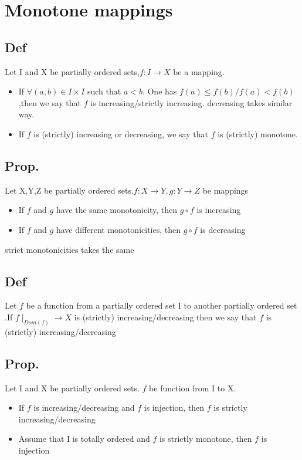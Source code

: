 \documentclass{book}
\begin{document}
\chapter{Monotone mappings}
\section{Def}

Let I and X be partially ordered sets,$f:I\rightarrow X$ be a mapping.
\begin{itemize}
    \item If $\forall(a,b)\in I\times I$ such that $a<b$. One has $f(a)\leq f(b)/f(a)<f(b)$,then we say that $f$ is increasing/strictly increasing. decreasing takes similar way.
    \item If $f$ is (strictly) increasing or decreasing, we say that $f$ is (strictly) monotone.
\end{itemize}
\section{Prop.}

Let  X,Y,Z be partially ordered sets.$f:X\rightarrow Y, g:Y\rightarrow Z$ be mappings
\begin{itemize}
    \item If $f$ and $g$ have the same monotonicity, then $g\circ f$ is increasing
    \item If $f$ and $g$ have different monotonicities, then $g\circ f$ is decreasing
\end{itemize}
strict monotonicities takes the same
\section{Def}

Let $f$ be a function from a partially ordered set I to another partially ordered set .If $f\mid_{Dom(f)}\rightarrow X$ is (strictly) increasing/decreasing then we say that $f$ is (strictly) increasing/decreasing
\section{Prop.}

Let I and X be partially ordered sets. $f$ be function from I to X.
\begin{itemize}
    \item If $f$ is increasing/decreasing and $f$ is injection, then $f$ is strictly increasing/decreasing
    \item Assume that I is totally ordered and $f$ is strictly monotone, then $f$ is injection
\end{itemize}
\end{document}

